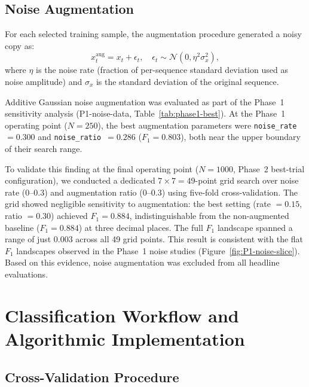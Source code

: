 \documentclass[journal=asbcd6,manuscript=suppinfo]{achemso}
\begin{document}
\subsection{Noise Augmentation}\label{sec:si-noise-augmentation}

For each selected training sample, the augmentation procedure generated a noisy copy as:
\begin{equation}
    x_t^{\text{aug}} = x_t + \epsilon_t, \quad \epsilon_t \sim \mathcal{N}(0, \eta^2 \sigma_x^2),
\end{equation}
where $\eta$ is the noise rate (fraction of per-sequence standard deviation used as noise amplitude) and $\sigma_x$ is the standard deviation of the original sequence.

Additive Gaussian noise augmentation was evaluated as part of the Phase~1 sensitivity analysis (P1-noise-data, Table~\ref{tab:phase1-best}). 
At the Phase~1 operating point ($N = 250$), the best augmentation parameters were \texttt{noise\_rate}~$= 0.300$ and \texttt{noise\_ratio}~$= 0.286$ ($F_1 = 0.803$), both near the upper boundary of their search range.

To validate this finding at the final operating point ($N = 1000$, Phase~2 best-trial configuration), we conducted a dedicated $7 \times 7 = 49$-point grid search over noise rate ($0$--$0.3$) and augmentation ratio ($0$--$0.3$) using five-fold cross-validation. 
The grid showed negligible sensitivity to augmentation: the best setting (rate $= 0.15$, ratio $= 0.30$) achieved $F_1 = 0.884$, indistinguishable from the non-augmented baseline ($F_1 = 0.884$) at three decimal places. 
The full $F_1$ landscape spanned a range of just $0.003$ across all 49 grid points.
This result is consistent with the flat $F_1$ landscapes observed in the Phase~1 noise studies (Figure~\ref{fig:P1-noise-slice}). Based on this evidence, noise augmentation was excluded from all headline evaluations.



\section{Classification Workflow and Algorithmic Implementation}

\subsection{Cross-Validation Procedure}
\end{document}
